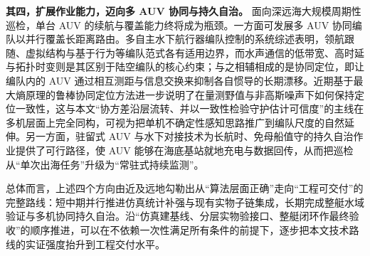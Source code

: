 \textbf{其四，扩展作业能力，迈向多 AUV 协同与持久自治。} 面向深远海大规模周期性巡检，单台 AUV 的续航与覆盖能力终将成为瓶颈。一方面可发展多 AUV 协同编队以并行覆盖长距离路由。多自主水下航行器编队控制的系统综述表明，领航跟随、虚拟结构与基于行为等编队范式各有适用边界，而水声通信的低带宽、高时延与拓扑时变则是其区别于陆空编队的核心约束\cite{yan2023formation}；与之相辅相成的是协同定位，即让编队内的 AUV 通过相互测距与信息交换来抑制各自惯导的长期漂移。近期基于最大熵原理的鲁棒协同定位方法进一步说明了在量测野值与非高斯噪声下如何保持定位一致性\cite{li2025cooplocalization}，这与本文``协方差沿层流转、并以一致性检验守护估计可信度''的主线在多机层面上完全同构，可视为把单机不确定性感知思路推广到编队尺度的自然延伸。另一方面，驻留式 AUV 与水下对接技术为长航时、免母船值守的持久自治作业提供了可行路径\cite{curtin2018resident}，使 AUV 能够在海底基站就地充电与数据回传，从而把巡检从``单次出海任务''升级为``常驻式持续监测''。

总体而言，上述四个方向由近及远地勾勒出从``算法层面正确''走向``工程可交付''的完整路线：短中期并行推进仿真统计补强与现有实物子链集成，长期完成整艇水域验证与多机协同持久自治。沿``仿真建基线、分层实物验接口、整艇闭环作最终验收''的顺序推进，可以在不依赖一次性满足所有条件的前提下，逐步把本文技术路线的实证强度抬升到工程交付水平。
